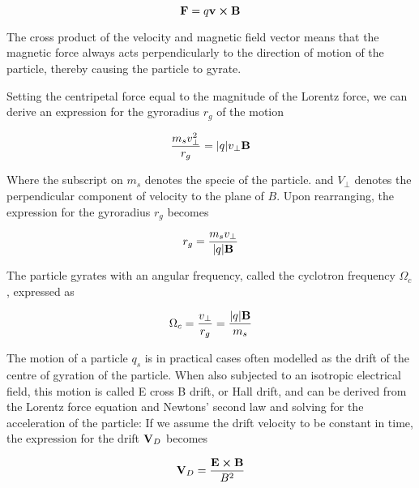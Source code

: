 \begin{equation}\label{eq:magF}
    \vb{F} = q \vb{v} \cross \vb{B}
\end{equation}

The cross product of the velocity and magnetic field vector means that the magnetic force always acts perpendicularly to the direction of motion of the particle, thereby causing the particle to gyrate.

Setting the centripetal force equal to the magnitude of the Lorentz force, we can derive an expression for the gyroradius $r_g$ of the motion

\begin{equation}\label{eq:gyrorad}
    \frac{m_s v_{\perp}^2}{r_g} = \abs{q} v_{\perp} \vb{B}
\end{equation}

Where the subscript on $m_s$ denotes the specie of the particle. and $V_\perp$ denotes the perpendicular component of velocity to  the plane of $B$. Upon rearranging, the expression for the gyroradius $r_g$ becomes

\begin{equation}
    r_g = \frac{m_s v_\perp}{\abs{q} \vb{B}}
\end{equation}

The particle gyrates with an angular frequency, called the cyclotron frequency $\Omega_c$, expressed as 

\begin{equation}
    \Omega_c = \frac{v_\perp}{r_g} = \frac{\abs{q} \vb{B}}{m_s}
\end{equation}

The motion of a particle $q_s$ is in practical cases often modelled as the drift of the centre of gyration of the particle. When also subjected to an isotropic electrical field, this motion is called E cross B drift, or Hall drift, and can be derived from the Lorentz force equation and Newtons' second law and solving for the acceleration of the particle: If we assume the drift velocity to be constant in time, the expression for the drift $\vb{V}_D$ becomes

\begin{equation}
    \vb{V}_D = \frac{\vb{E} \cross \vb{B}}{B^2}
\end{equation}

